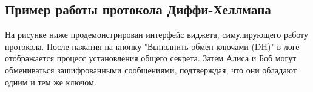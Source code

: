 \subsection{Пример работы протокола Диффи-Хеллмана}
На рисунке ниже продемонстрирован интерфейс виджета, симулирующего работу протокола. После нажатия на кнопку "Выполнить обмен ключами (DH)" в логе отображается процесс установления общего секрета. Затем Алиса и Боб могут обмениваться зашифрованными сообщениями, подтверждая, что они обладают одним и тем же ключом.

